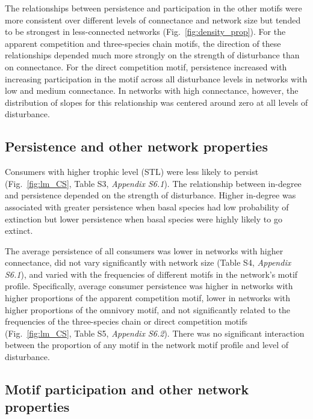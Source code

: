 \documentclass[12pt]{article}
\begin{document}
\begin{spacing}{2.0}
        The relationships between persistence and participation in the other motifs were more consistent over different levels of connectance and network size but tended to be strongest in less-connected networks (Fig.~\ref{fig:density_prop}).
        For the apparent competition and three-species chain motifs, the direction of these relationships depended much more strongly on the strength of disturbance than on connectance.
        For the direct competition motif, persistence increased with increasing participation in the motif across all disturbance levels in networks with low and medium connectance.
        In networks with high connectance, however, the distribution of slopes for this relationship was centered around zero at all levels of disturbance.


    \subsection*{Persistence and other network properties}

       Consumers with higher trophic level (STL) were less likely to persist (Fig.~\ref{fig:lm_CS}, Table S3, \emph{Appendix S6.1}).
        The relationship between in-degree and persistence depended on the strength of disturbance.
        Higher in-degree was associated with greater persistence when basal species had low probability of extinction but lower persistence when basal species were highly likely to go extinct.


        The average persistence of all consumers was lower in networks with higher connectance, did not vary significantly with network size (Table S4, \emph{Appendix S6.1}), and  varied with the frequencies of different motifs in the network's motif profile.
        Specifically, average consumer persistence was higher in networks with higher proportions of the apparent competition motif, lower in networks with higher proportions of the omnivory motif, and not significantly related to the frequencies of the three-species chain or direct competition motifs (Fig.~\ref{fig:lm_CS}, Table S5, \emph{Appendix S6.2}).
        There was no significant interaction between the proportion of any motif in the network motif profile and level of disturbance.


    \subsection*{Motif participation and other network properties}



\end{spacing}
\end{document}
